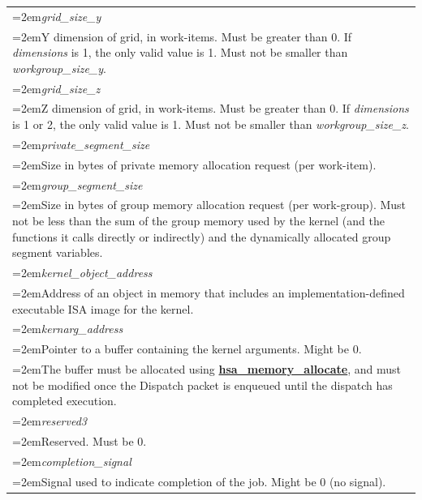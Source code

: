 \documentclass[final,oneside]{book}
\newcommand{\reffun}[1]{\textbf{#1}}
\newcommand{\reffld}[1]{\textit{#1}}
\begin{document}
\begin{longtable}{@{}>{\hangindent=2em}p{\textwidth}}
\hypertarget{hsa_\-dispatch_\-packet_\-t.grid_\-size_\-y}{\reffld{grid_\-size_\-y}}\\\hspace{2em}Y dimension of grid, in work-items. Must be greater than 0. If \textit{dimensions} is 1, the only valid value is 1. Must not be smaller than \textit{workgroup_\-size_\-y}.\\[2mm]
\hypertarget{hsa_\-dispatch_\-packet_\-t.grid_\-size_\-z}{\reffld{grid_\-size_\-z}}\\\hspace{2em}Z dimension of grid, in work-items. Must be greater than 0. If \textit{dimensions} is 1 or 2, the only valid value is 1. Must not be smaller than \textit{workgroup_\-size_\-z}.\\[2mm]
\hypertarget{hsa_\-dispatch_\-packet_\-t.private_\-segment_\-size}{\reffld{private_\-segment_\-size}}\\\hspace{2em}Size in bytes of private memory allocation request (per work-item).\\[2mm]
\hypertarget{hsa_\-dispatch_\-packet_\-t.group_\-segment_\-size}{\reffld{group_\-segment_\-size}}\\\hspace{2em}Size in bytes of group memory allocation request (per work-group). Must not be less than the sum of the group memory used by the kernel (and the functions it calls directly or indirectly) and the dynamically allocated group segment variables.\\[2mm]
\hypertarget{hsa_\-dispatch_\-packet_\-t.kernel_\-object_\-address}{\reffld{kernel_\-object_\-address}}\\\hspace{2em}Address of an object in memory that includes an implementation-defined executable ISA image for the kernel.\\[2mm]
\hypertarget{hsa_\-dispatch_\-packet_\-t.kernarg_\-address}{\reffld{kernarg_\-address}}\\\hspace{2em}Pointer to a buffer containing the kernel arguments. Might be 0.\\
\hspace{2em}The buffer must be allocated using \hyperlink{group__memory_1ga39f7943b93aa2bb754726fc74d929426}{\reffun{hsa_\-memory_\-allocate}}, and must not be modified once the Dispatch packet is enqueued until the dispatch has completed execution.\\[2mm]
\hypertarget{hsa_\-dispatch_\-packet_\-t.reserved3}{\reffld{reserved3}}\\\hspace{2em}Reserved. Must be 0.\\[2mm]
\hypertarget{hsa_\-dispatch_\-packet_\-t.completion_\-signal}{\reffld{completion_\-signal}}\\\hspace{2em}Signal used to indicate completion of the job. Might be 0 (no signal).
\end{longtable}
\end{document}
